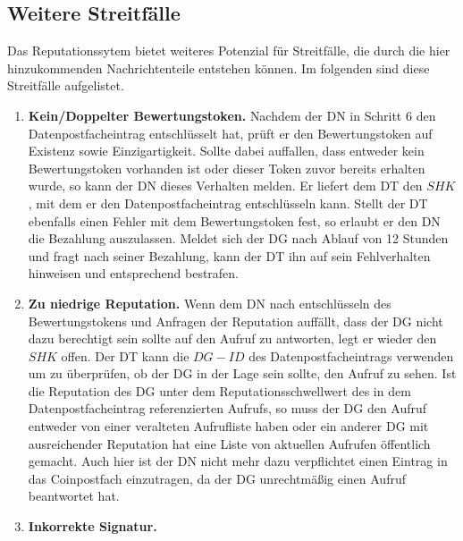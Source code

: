 \documentclass[
	fontsize=11pt,
	headings=small,
	parskip=half,           %
	bibliography=totoc,
	numbers=noenddot,       %
	open=any,               %
]{scrreprt}
\begin{document}
\subsection{Weitere Streitfälle}
\label{subsec:repStreit}
Das Reputationssytem bietet weiteres Potenzial für Streitfälle, die durch die hier hinzukommenden Nachrichtenteile entstehen können. Im folgenden sind diese Streitfälle aufgelistet.
\begin{enumerate}
    \item \textbf{Kein/Doppelter Bewertungstoken.} \label{case:badRepToken}
    Nachdem der DN in Schritt 6 den Datenpostfacheintrag entschlüsselt hat, prüft er den Bewertungstoken auf Existenz sowie Einzigartigkeit. Sollte dabei auffallen, dass entweder kein Bewertungstoken vorhanden ist oder dieser Token zuvor bereits erhalten wurde, so kann der DN dieses Verhalten melden. Er liefert dem DT den $SHK$, mit dem er den Datenpostfacheintrag entschlüsseln kann. Stellt der DT ebenfalls einen Fehler mit dem Bewertungstoken fest, so erlaubt er den DN die Bezahlung auszulassen. Meldet sich der DG nach Ablauf von 12 Stunden und fragt nach seiner Bezahlung, kann der DT ihn auf sein Fehlverhalten hinweisen und entsprechend bestrafen.
    \item \textbf{Zu niedrige Reputation.} \label{case:insufficientRep}
    Wenn dem DN nach entschlüsseln des Bewertungstokens und Anfragen der Reputation auffällt, dass der DG nicht dazu berechtigt sein sollte auf den Aufruf zu antworten, legt er wieder den $SHK$ offen. Der DT kann die $DG-ID$ des Datenpostfacheintrags verwenden um zu überprüfen, ob der DG in der Lage sein sollte, den Aufruf zu sehen. Ist die Reputation des DG unter dem Reputationsschwellwert des in dem Datenpostfacheintrag referenzierten Aufrufs, so muss der DG den Aufruf entweder von einer veralteten Aufrufliste haben oder ein anderer DG mit ausreichender Reputation hat eine Liste von aktuellen Aufrufen öffentlich gemacht. Auch hier ist der DN nicht mehr dazu verpflichtet einen Eintrag in das Coinpostfach einzutragen, da der DG unrechtmäßig einen Aufruf beantwortet hat.
    \item \textbf{Inkorrekte Signatur.} \label{case:badSignature}

\end{enumerate}
\end{document}
